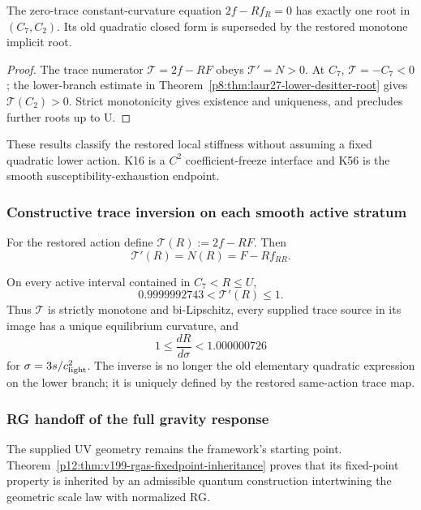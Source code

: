 \documentclass[12pt,a4paper]{article}
\begin{document}
\begin{corollary}
\label{p8:cor:v199-hierarchy-vacuum}
The zero-trace constant-curvature equation $2f-Rf_R=0$ has exactly one root
in $(C_7,C_2)$.  Its old quadratic closed form is superseded by the restored
monotone implicit root.
\end{corollary}
\begin{proof}
The trace numerator $\mathcal T=2f-RF$ obeys $\mathcal T'=N>0$.
At $C_7$, $\mathcal T=-C_7<0$; the lower-branch estimate in
Theorem~\ref{p8:thm:laur27-lower-desitter-root} gives
$\mathcal T(C_2)>0$.  Strict monotonicity gives existence and uniqueness, and
precludes further roots up to U.
\end{proof}

These results classify the restored local stiffness without assuming a fixed
quadratic lower action.  K16 is a $C^2$ coefficient-freeze interface and K56
is the smooth susceptibility-exhaustion endpoint.

\subsubsection{Constructive trace inversion on each smooth active stratum}
\label{p8:sec:v202-trace-inverse}
For the restored action define $\mathcal T(R):=2f-RF$.  Then
\[
 \boxed{\mathcal T'(R)=N(R)=F-Rf_{RR}.}
\]
\begin{theorem}
\label{p8:thm:v202-trace-inverse}
On every active interval contained in $C_7<R\le U$,
\[
 0.9999992743<\mathcal T'(R)\le1.
\]
Thus $\mathcal T$ is strictly monotone and bi-Lipschitz, every supplied trace
source in its image has a unique equilibrium curvature, and
\[
 1\le\frac{dR}{d\sigma}<1.000000726
\]
for $\sigma=3s/c_{\rm light}^2$.  The inverse is no longer the old elementary
quadratic expression on the lower branch; it is uniquely defined by the
restored same-action trace map.
\end{theorem}

\subsubsection{RG handoff of the full gravity response}
\label{p8:sec:v199-rgas-gravity-handoff}
The supplied UV geometry remains the framework's starting point.
Theorem~\ref{p12:thm:v199-rgas-fixedpoint-inheritance} proves that its
fixed-point property is inherited by an admissible quantum construction
intertwining the geometric scale law with normalized RG.
\end{document}
